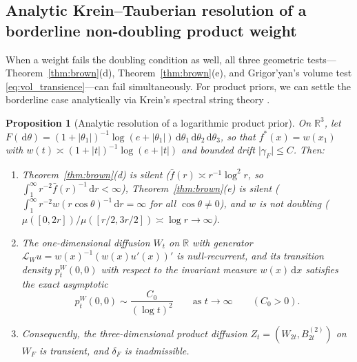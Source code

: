 \documentclass[a4paper,11pt,noarxiv]{quantumarticle}
\newcommand{\R}{\mathbb{R}}
\newcommand{\abs}[1]{\lvert #1\rvert}
\newcommand{\dd}{\,\mathrm{d}}
\newcommand{\fbar}{\bar f}
\theoremstyle{plain}
\newtheorem{proposition}[theorem]{Proposition}
\theoremstyle{definition}
\theoremstyle{remark}
\begin{document}
\subsection{Analytic Krein--Tauberian resolution of a borderline
non-doubling product weight}

When a weight fails the doubling condition as well, all three geometric
tests---Theorem~\ref{thm:brown}(d), Theorem~\ref{thm:brown}(e), and
Grigor'yan's volume test \eqref{eq:vol_transience}---can fail
simultaneously. For product priors, we can settle the borderline case
analytically via Krein's spectral string theory \cite{kasahara1975,kotani1982}.

\begin{proposition}[Analytic resolution of a logarithmic product prior]
\label{prop:krein}
On $\R^3$, let $F(\dd\theta)=(1+\abs{\theta_1})^{-1}\log(e+\abs{\theta_1})
\dd\theta_1\dd\theta_2\dd\theta_3$, so that $f^*(x)=w(x_1)$ with
$w(t)\asymp(1+\abs{t})^{-1}\log(e+\abs{t})$ and bounded drift
$\abs{\gamma_F}\le C$. Then:
\begin{enumerate}[label=\textup{(\roman*)},leftmargin=2em,itemsep=2pt]
\item Theorem~\ref{thm:brown}(d) is silent ($\fbar(r)\asymp r^{-1}\log^2 r$,
so $\int_1^\infty r^{-2}\fbar(r)^{-1}\dd r<\infty$), Theorem~\ref{thm:brown}(e)
is silent ($\int_1^\infty r^{-2}w(r\cos\theta)^{-1}\dd r=\infty$ for all
$\cos\theta\ne0$), and $w$ is not doubling ($\mu([0,2r])/\mu([r/2,3r/2])\asymp\log r\to\infty$).
\item The one-dimensional diffusion $W_t$ on $\R$ with generator
$\mathcal L_W u=w(x)^{-1}(w(x)u'(x))'$ is null-recurrent, and its
transition density $p_t^W(0,0)$ with respect to the invariant measure
$w(x)\dd x$ satisfies the exact asymptotic
\begin{equation}\label{eq:krein_asymp}
p_t^W(0,0)\sim\frac{C_0}{(\log t)^2}\qquad\text{as }t\to\infty
\qquad(C_0>0).
\end{equation}
\item Consequently, the three-dimensional product diffusion
$Z_t=(W_{2t},B_{2t}^{(2)})$ on $W_F$ is transient, and $\delta_F$ is
inadmissible.
\end{enumerate}
\end{proposition}
\end{document}
